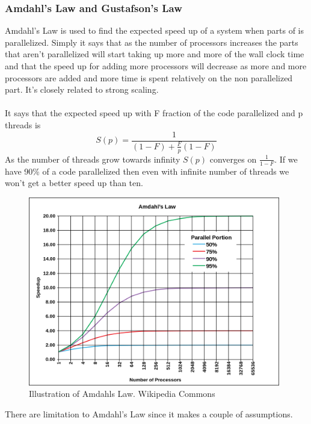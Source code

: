 \documentclass[10pt,a4paper]{report}
\begin{document}
\subsubsection{Amdahl's Law and Gustafson's Law}
Amdahl's Law is used to find the expected speed up of a system when parts of is parallelized. Simply it says that as the number of processors increases the parts that aren't parallelized will start taking up more and more of the wall clock time and that the speed up for adding more processors will decrease as more and more processors are added and more time is spent relatively on the non parallelized part. It's closely related to strong scaling.\cite{cuda_best_practice,2010_reevaluating_amdahl}\\
\\
It says that the expected speed up with F fraction of the code parallelized and p threads is 
$$S(p)=\frac{1}{(1-F)+\frac{F}{p}(1-F)}$$
As the number of threads grow towards infinity $S(p)$ converges on $\frac{1}{1-F}$. If we have 90\% of a code parallelized then even with infinite number of threads we won't get a better speed up than ten.\cite{2010_reevaluating_amdahl}

\begin{figure}[h]
    \centering
    \includegraphics[width=11cm]{AmdahlsLaw.png}
    \caption{Illustration of Amdahls Law. Wikipedia Commons}
    \label{fig:AmdahlsLaw}
\end{figure}

There are limitation to Amdahl's Law since it makes a couple of assumptions.
\end{document}

